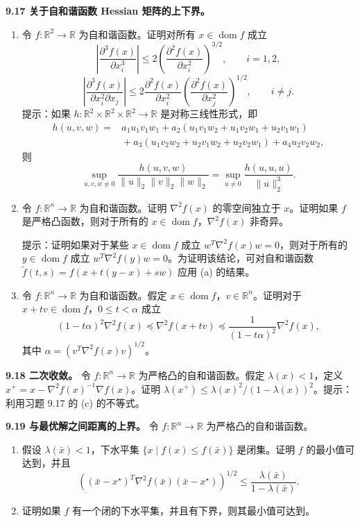 \documentclass[UTF8, 12pt, fontset=fandol, oneside]{ctexart}
\begin{document}
\noindent\textbf{9.17 关于自和谐函数 Hessian 矩阵的上下界。}
\begin{enumerate}
\item[(a)] 令 $f:\mathbb{R}^2\to\mathbb{R}$ 为自和谐函数。证明对所有 $x\in\operatorname{dom} f$ 成立
\[
\left|\frac{\partial^3 f(x)}{\partial x_i^3}\right|\leq2\left(\frac{\partial^2 f(x)}{\partial x_i^2}\right)^{3/2},
\qquad i=1,2,
\]
\[
\left|\frac{\partial^3 f(x)}{\partial x_i^2\partial x_j}\right|\leq
2\frac{\partial^2 f(x)}{\partial x_i^2}\left(\frac{\partial^2 f(x)}{\partial x_j^2}\right)^{1/2},
\qquad i\neq j.
\]
提示：如果 $h:\mathbb{R}^2\times\mathbb{R}^2\times\mathbb{R}^2\to\mathbb{R}$ 是对称三线性形式，即
\[
\begin{aligned}
h(u,v,w)={}&a_1u_1v_1w_1+a_2(u_1v_1w_2+u_1v_2w_1+u_2v_1w_1)\\
&{}+a_3(u_1v_2w_2+u_2v_1w_2+u_2v_2w_1)+a_4u_2v_2w_2,
\end{aligned}
\]
则
\[
\sup_{u,v,w\neq0}\frac{h(u,v,w)}{\|u\|_2\|v\|_2\|w\|_2}
=\sup_{u\neq0}\frac{h(u,u,u)}{\|u\|_2^3}.
\]
\item[(b)] 令 $f:\mathbb{R}^n\to\mathbb{R}$ 为自和谐函数。证明 $\nabla^2 f(x)$ 的零空间独立于 $x$。证明如果 $f$ 是严格凸函数，则对于所有的 $x\in\operatorname{dom} f$，$\nabla^2 f(x)$ 非奇异。

提示：证明如果对于某些 $x\in\operatorname{dom} f$ 成立 $w^T\nabla^2 f(x)w=0$，则对于所有的 $y\in\operatorname{dom} f$ 成立 $w^T\nabla^2 f(y)w=0$。为证明该结论，可对自和谐函数 $\tilde f(t,s)=f(x+t(y-x)+sw)$ 应用 (a) 的结果。
\item[(c)] 令 $f:\mathbb{R}^n\to\mathbb{R}$ 为自和谐函数。假定 $x\in\operatorname{dom} f$，$v\in\mathbb{R}^n$。证明对于 $x+tv\in\operatorname{dom} f$，$0\leq t<\alpha$ 成立
\[
(1-t\alpha)^2\nabla^2 f(x)\preceq\nabla^2 f(x+tv)\preceq
\frac{1}{(1-t\alpha)^2}\nabla^2 f(x),
\]
其中 $\alpha=(v^T\nabla^2 f(x)v)^{1/2}$。
\end{enumerate}

\noindent\textbf{9.18 二次收敛。}\quad
令 $f:\mathbb{R}^n\to\mathbb{R}$ 为严格凸的自和谐函数。假定 $\lambda(x)<1$，定义 $x^+=x-\nabla^2 f(x)^{-1}\nabla f(x)$。证明 $\lambda(x^+)\leq\lambda(x)^2/(1-\lambda(x))^2$。提示：利用习题 9.17 的 (c) 的不等式。

\noindent\textbf{9.19 与最优解之间距离的上界。}\quad
令 $f:\mathbb{R}^n\to\mathbb{R}$ 为严格凸的自和谐函数。
\begin{enumerate}
\item[(a)] 假设 $\lambda(\bar x)<1$，下水平集 $\{x\mid f(x)\leq f(\bar x)\}$ 是闭集。证明 $f$ 的最小值可达到，并且
\[
\left((\bar x-x^\star)^T\nabla^2 f(\bar x)(\bar x-x^\star)\right)^{1/2}
\leq\frac{\lambda(\bar x)}{1-\lambda(\bar x)}.
\]
\item[(b)] 证明如果 $f$ 有一个闭的下水平集，并且有下界，则其最小值可达到。
\end{enumerate}
\end{document}
